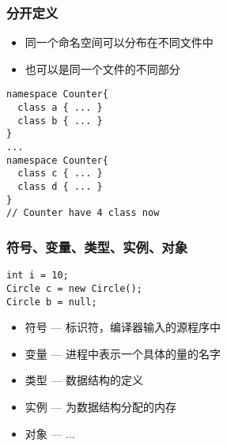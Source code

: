 \begin{frame}[fragile]
\frametitle{分开定义}
\begin{itemize}
\item 同一个命名空间可以分布在不同文件中
\item 也可以是同一个文件的不同部分
\end{itemize}
\begin{lstlisting}
namespace Counter{
  class a { ... }
  class b { ... }
}
...
namespace Counter{
  class c { ... }
  class d { ... }
}
// Counter have 4 class now
\end{lstlisting}
\end{frame}

\begin{frame}[fragile]
\frametitle{符号、变量、类型、实例、对象}

\begin{lstlisting}
int i = 10;
Circle c = new Circle();
Circle b = null;
\end{lstlisting}

\begin{itemize}
\setlength{\itemsep}{8pt plus 1pt}
\item 符号 --- 标识符，编译器输入的源程序中
\item 变量 --- 进程中表示一个具体的量的名字
\item 类型 --- 数据结构的定义
\item 实例 --- 为数据结构分配的内存
\item 对象 --- ...
\end{itemize}

\end{frame}


